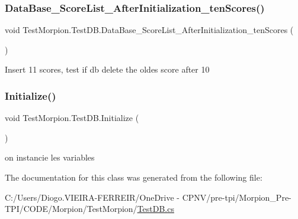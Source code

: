 \subsubsection{\texorpdfstring{Data\+Base\+\_\+\+Score\+List\+\_\+\+After\+Initialization\+\_\+ten\+Scores()}{DataBase\_ScoreList\_AfterInitialization\_tenScores()}}
{\footnotesize\ttfamily void Test\+Morpion.\+Test\+D\+B.\+Data\+Base\+\_\+\+Score\+List\+\_\+\+After\+Initialization\+\_\+ten\+Scores (\begin{DoxyParamCaption}{ }\end{DoxyParamCaption})}



Insert 11 scores, test if db delete the oldes score after 10 

\mbox{\label{class_test_morpion_1_1_test_d_b_a4ac592a6b2dc14e87feb0154285126b4}} 
\subsubsection{\texorpdfstring{Initialize()}{Initialize()}}
{\footnotesize\ttfamily void Test\+Morpion.\+Test\+D\+B.\+Initialize (\begin{DoxyParamCaption}{ }\end{DoxyParamCaption})}



on instancie les variables 



The documentation for this class was generated from the following file\+:\begin{DoxyCompactItemize}
\item 
C\+:/\+Users/\+Diogo.\+V\+I\+E\+I\+R\+A-\/\+F\+E\+R\+R\+E\+I\+R/\+One\+Drive -\/ C\+P\+N\+V/pre-\/tpi/\+Morpion\+\_\+\+Pre-\/\+T\+P\+I/\+C\+O\+D\+E/\+Morpion/\+Test\+Morpion/\hyperlink{_test_d_b_8cs}{Test\+D\+B.\+cs}\end{DoxyCompactItemize}
